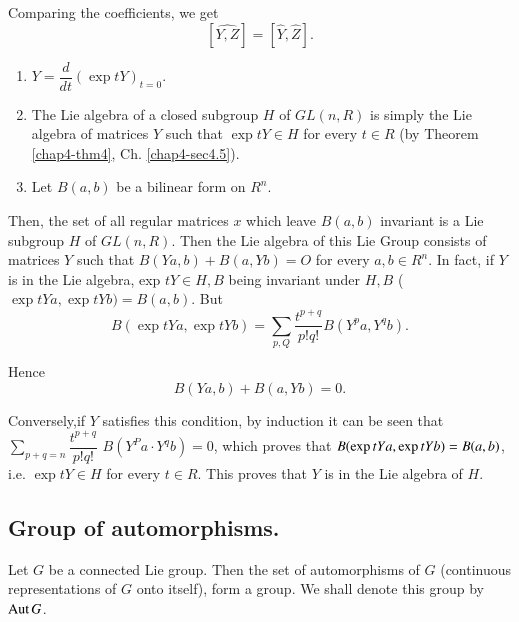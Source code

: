 Comparing the coefficients, we get
$$
[\hat{Y,Z}]=[\hat{Y},\hat{Z}].
$$

\begin{remarks*}
\begin{enumerate}
\renewcommand{\labelenumi}{(\theenumi)}
\item $Y = \dfrac{d}{dt}(\exp tY)_{t=0}$.

\item The Lie algebra of a closed subgroup $H$ of $GL(n,R)$ is simply
  the Lie algebra of matrices $Y$ such that $\exp t Y \in H$ for every
  $t \in R$ (by  Theorem \ref{chap4-thm4}, Ch. \ref{chap4-sec4.5}). 

\item Let  $B(a,b)$ be a bilinear form on $R^n$. 
\end{enumerate}
\end{remarks*}

Then, the set of all regular matrices $x$ which leave $B(a,b)$
invariant is a Lie subgroup $H$ of $GL(n,R)$. Then the Lie algebra of
this Lie Group consists of matrices $Y$ such that $B (Ya, b) +B(a,Yb)
=O$ for every $a,b \in R^n$. In fact, if $Y$ is in the Lie algebra,
exp   $t Y \in H , B$ being invariant under $H,B$ ($\exp tY a, \exp t
Y b ) = B (a,b)$. But  
$$
B(\exp t Y a, \exp t Y b ) =
\sum\limits_{p,Q}\dfrac{t^{p+q}}{p!q!}B (Y^p a, Y^qb).  
$$

Hence 
$$
B(Ya,b) + B(a,Yb) = 0.
$$


Conversely,\pageoriginale if $Y$ satisfies this condition, by
induction it can be 
seen that $\sum\limits_{p+q=n} \dfrac{t^{p+q}}{p!q!}$ $B(Y^P a \cdot Y^q
b)=0$, which proves that $B(\exp  t Y a, \exp\break  tYb) = B(a, b)$,
i.e. $\exp t Y \in H$ for every $t \in R$. This proves that $Y$ is
in the Lie algebra of $H$. 


\subsection{Group of automorphisms.}\label{chap4-sec4.7}%

Let $G$ be a connected Lie group. Then the set of automorphisms of $G$
(continuous representations of $G$ onto itself), form a group. We
shall denote this group by $\operatorname{Aut} G$. 

